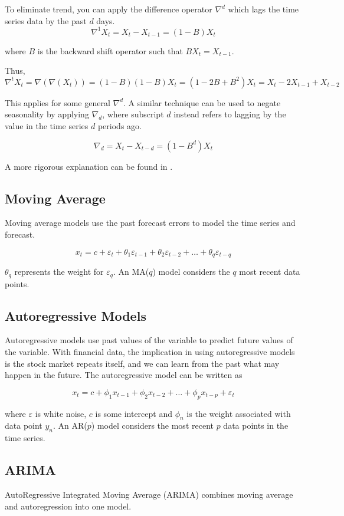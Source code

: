 \documentclass[12pt]{article}
\begin{document}
To eliminate trend, you can apply the difference operator $\nabla^d$ which lags the time series data by the past $d$ days.
$$\nabla^1 X_t = X_t - X_{t-1}=(1-B)X_t$$

where $B$ is the backward shift operator such that $BX_t = X_{t-1}$.

Thus, $$\nabla^t X_t = \nabla(\nabla(X_t)) = (1-B)(1-B)X_t = (1-2B+B^2)X_t = X_t-2X_{t-1}+X_{t-2}$$

This applies for some general $\nabla^d$. A similar technique can be used to negate seasonality by applying $\nabla_d$, where subscript $d$ instead refers to lagging by the value in the time series $d$ periods ago.

$$\nabla_d = X_t - X_{t-d} = (1-B^d) X_t$$

A more rigorous explanation can be found in \cite[22-32]{timeseries}.

\subsection{Moving Average}
Moving average models use the past forecast errors to model the time series and forecast. 

$$ x_{t} = c + \varepsilon_t + \theta_{1}\varepsilon_{t-1} + \theta_{2}\varepsilon_{t-2} + \dots + \theta_{q}\varepsilon_{t-q}$$

$\theta_q$ represents the weight for $\varepsilon_q$. An MA($q$) model considers the $q$ most recent data points. \cite[8.4]{forecasting}


\subsection{Autoregressive Models}
Autoregressive models use past values of the variable to predict future values of the variable. With financial data, the implication in using autoregressive models is the stock market repeats itself, and we can learn from the past what may happen in the future. \cite[8.3]{forecasting} The autoregressive model can be written as 

$$x_{t} = c + \phi_{1}x_{t-1} + \phi_{2}x_{t-2} + \dots + \phi_{p}x_{t-p} + \varepsilon_{t}$$

where $\varepsilon$ is white noise, $c$ is some intercept and $\phi_n$ is the weight associated with data point $y_n$. An AR($p$) model considers the most recent $p$ data points in the time series.

\subsection{ARIMA}
AutoRegressive Integrated Moving Average (ARIMA) combines moving average and autoregression into one model. 
\end{document}
